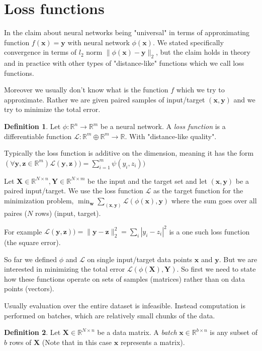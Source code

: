 \documentclass[11pt, a4paper]{report}
\theoremstyle{plain}
\theoremstyle{definition}
\newtheorem{mydef}{Definition}[chapter]
\theoremstyle{remark}
\newcommand{\R}{\mathbb{R}}
\newcommand{\X}{\mathbf{X}}
\newcommand{\x}{\mathbf{x}}
\newcommand{\z}{\mathbf{z}}
\newcommand{\Y}{\mathbf{Y}}
\newcommand{\y}{\mathbf{y}}
\newcommand{\w}{\mathbf{w}}
\newcommand{\bv}[1]{\boldsymbol{#1}}
\begin{document}
\section{Loss functions}

In the claim about neural networks being "universal" in terms of approximating
function $f(\x)=\y$ with neural network $\phi(\x)$. We stated specifically
convergence in terms of $l_2$ norm $\|\phi(\x) - \y \|_2$, but the claim holds
in theory and in practice with other types of "distance-like" functions which we
call loss functions.

Moreover we usually don't know what is the function $f$ which we try to
approximate. Rather we are given paired samples of input/target $(\x, \y)$ and
we try to minimize the total error.

\begin{mydef}
\label{def:lossfunc}
Let $\phi :\R^n \to \R^m$ be a neural network.
A \textit{loss function} is a differentiable
function $\mathcal{L} : \R^{m}\oplus\R^m \to \R$. 
With "distance-like quality".
\end{mydef}

Typically the loss function is additive on the dimension, meaning it has the
form $(\forall \y,\z \in \R^m) \mathcal{L}(\y, \z)) = \sum_{i=1}^m \psi(y_i,
z_i))$

Let $\X \in \R^{N \times n}, \Y \in \R^{N \times m}$ be the input and the target
set and let $(\x,\y)$ be a paired input/target. We use the loss function
$\mathcal{L}$ as the target function for the minimization problem, $\min_{\w}
\sum_{(\x,\y)}\mathcal{L}(\phi(\x), \y)$ where the sum goes over all paires ($N$
rows)  (input, target).


For example $\mathcal{L}(\y, \z)) = \|\y - \z\|_2^2 = \sum_i |y_i - z_i|^2$ is a
one such loss function (the square error).

So far we defined $\phi$ and $\mathcal{L}$ on single input/target data points
$\x$ and $\y$. But we are interested in minimizing the total error
$\mathcal{L}(\phi(\X),\Y)$. So first we need to state how these functions
operate on sets of samples (matrices) rather than on data points (vectors).

Usually evaluation over the entire dataset is infeasible. Instead computation is
performed on batches, which are relatively small chunks of the data.

\begin{mydef}
\label{def:batch}
Let $\bv{X} \in  \R^{N \times n}$ be a data matrix. A \emph{batch}
$\bv{x} \in \R^{b \times n}$ is any subset of $b$ rows of $\bv{X}$
(Note that in this case $\x$ represents a matrix).
\end{mydef}
\end{document}
